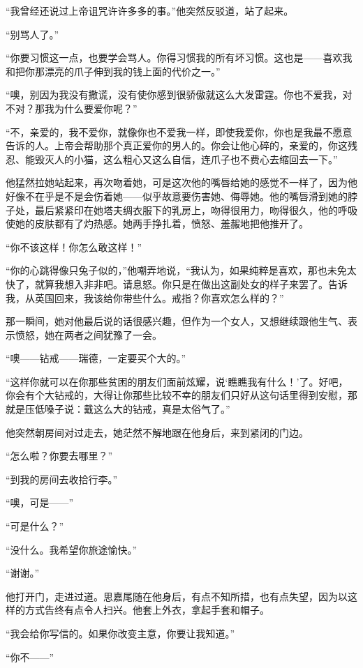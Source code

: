 \par “我曾经还说过上帝诅咒许许多多的事。”他突然反驳道，站了起来。
\par “别骂人了。”
\par “你要习惯这一点，也要学会骂人。你得习惯我的所有坏习惯。这也是——喜欢我和把你那漂亮的爪子伸到我的钱上面的代价之一。”
\par “噢，别因为我没有撒谎，没有使你感到很骄傲就这么大发雷霆。你也不爱我，对不对？那我为什么要爱你呢？”
\par “不，亲爱的，我不爱你，就像你也不爱我一样，即使我爱你，你也是我最不愿意告诉的人。上帝会帮助那个真正爱你的男人的。你会让他心碎的，亲爱的，你这残忍、能毁灭人的小猫，这么粗心又这么自信，连爪子也不费心去缩回去一下。”
\par 他猛然拉她站起来，再次吻着她，可是这次他的嘴唇给她的感觉不一样了，因为他好像不在乎是不是会伤着她——似乎故意要伤害她、侮辱她。他的嘴唇滑到她的脖子处，最后紧紧印在她塔夫绸衣服下的乳房上，吻得很用力，吻得很久，他的呼吸使她的皮肤都有了灼热感。她两手挣扎着，愤怒、羞赧地把他推开了。
\par “你不该这样！你怎么敢这样！”
\par “你的心跳得像只兔子似的，”他嘲弄地说，“我认为，如果纯粹是喜欢，那也未免太快了，就算我想入非非吧。请息怒。你只是在做出这副处女的样子来罢了。告诉我，从英国回来，我该给你带些什么。戒指？你喜欢怎么样的？”
\par 那一瞬间，她对他最后说的话很感兴趣，但作为一个女人，又想继续跟他生气、表示愤怒，她在两者之间犹豫了一会。
\par “噢——钻戒——瑞德，一定要买个大的。”
\par “这样你就可以在你那些贫困的朋友们面前炫耀，说‘瞧瞧我有什么！’了。好吧，你会有个大钻戒的，大得让你那些比较不幸的朋友们只好从这句话里得到安慰，那就是压低嗓子说：戴这么大的钻戒，真是太俗气了。”
\par 他突然朝房间对过走去，她茫然不解地跟在他身后，来到紧闭的门边。
\par “怎么啦？你要去哪里？”
\par “到我的房间去收拾行李。”
\par “噢，可是——”
\par “可是什么？”
\par “没什么。我希望你旅途愉快。”
\par “谢谢。”
\par 他打开门，走进过道。思嘉尾随在他身后，有点不知所措，也有点失望，因为以这样的方式告终有点令人扫兴。他套上外衣，拿起手套和帽子。
\par “我会给你写信的。如果你改变主意，你要让我知道。”
\par “你不——”
